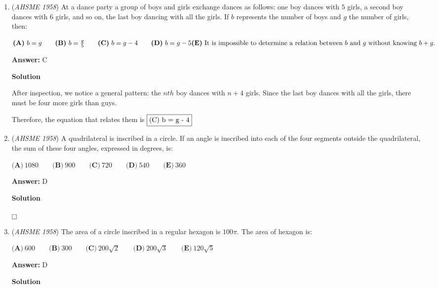 \begin{enumerate}
 (Which is a lot easier than finding the roots of $x^2-10x+20$.)

 


	\item (\textit{AHSME 1958}) At a dance party a group of boys and girls exchange dances as follows: one boy dances with $5$ girls, a second boy dances with $6$ girls, and so on, the last boy dancing with all the girls. If $b$ represents the number of boys and $g$ the number of girls, then:


 $\textbf{(A)}\ b = g\qquad  \textbf{(B)}\ b = \frac{g}{5}\qquad  \textbf{(C)}\ b = g - 4\qquad  \textbf{(D)}\ b = g - 5\qquad \\ \textbf{(E)}\ \text{It is impossible to determine a relation between }{b}\text{ and }{g}\text{ without knowing }{b + g.}$

 \textbf{Answer: }C



\textbf{Solution}

After inspection, we notice a general pattern: the $nth$ boy dances with $n + 4$ girls. Since the last boy dances with all the girls, there must be four more girls than guys.

 Therefore, the equation that relates them is $\fbox{(C) b = g - 4}$



	\item (\textit{AHSME 1958}) A quadrilateral is inscribed in a circle. If an angle is inscribed into each of the four segments outside the quadrilateral, the sum of these four angles, expressed in degrees, is:


 $\textbf{(A)}\ 1080\qquad  \textbf{(B)}\ 900\qquad  \textbf{(C)}\ 720\qquad  \textbf{(D)}\ 540\qquad  \textbf{(E)}\ 360$

 \textbf{Answer: }D



\textbf{Solution}

$\fbox{}$



	\item (\textit{AHSME 1958}) The area of a circle inscribed in a regular hexagon is $100\pi$. The area of hexagon is:


 $\textbf{(A)}\ 600\qquad  \textbf{(B)}\ 300\qquad  \textbf{(C)}\ 200\sqrt{2}\qquad  \textbf{(D)}\ 200\sqrt{3}\qquad  \textbf{(E)}\ 120\sqrt{5}$

 \textbf{Answer: }D



\textbf{Solution}


\end{enumerate}
